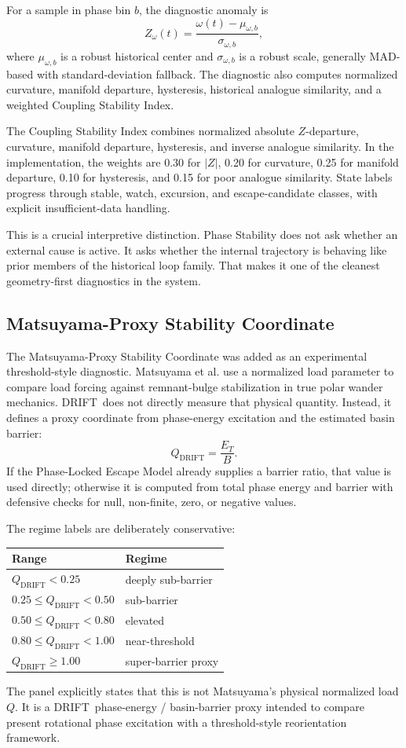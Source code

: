 \documentclass[11pt]{article}
\newcommand{\DRIFT}{\textsc{DRIFT}}
\newcommand{\Qdrift}{Q_{\mathrm{DRIFT}}}
\newcommand{\Zomega}{Z_{\omega}}
\begin{document}
For a sample in phase bin \(b\), the diagnostic anomaly is
\[
\Zomega(t)=\frac{\omega(t)-\mu_{\omega,b}}{\sigma_{\omega,b}},
\]
where \(\mu_{\omega,b}\) is a robust historical center and \(\sigma_{\omega,b}\) is a robust scale, generally MAD-based with standard-deviation fallback. The diagnostic also computes normalized curvature, manifold departure, hysteresis, historical analogue similarity, and a weighted Coupling Stability Index.

The Coupling Stability Index combines normalized absolute \(Z\)-departure, curvature, manifold departure, hysteresis, and inverse analogue similarity. In the implementation, the weights are 0.30 for \(|Z|\), 0.20 for curvature, 0.25 for manifold departure, 0.10 for hysteresis, and 0.15 for poor analogue similarity. State labels progress through stable, watch, excursion, and escape-candidate classes, with explicit insufficient-data handling.

This is a crucial interpretive distinction. Phase Stability does not ask whether an external cause is active. It asks whether the internal trajectory is behaving like prior members of the historical loop family. That makes it one of the cleanest geometry-first diagnostics in the system.

\subsection{Matsuyama-Proxy Stability Coordinate}
The Matsuyama-Proxy Stability Coordinate was added as an experimental threshold-style diagnostic. Matsuyama et al. use a normalized load parameter to compare load forcing against remnant-bulge stabilization in true polar wander mechanics. \DRIFT\ does not directly measure that physical quantity. Instead, it defines a proxy coordinate from phase-energy excitation and the estimated basin barrier:
\[
\Qdrift=\frac{E_T}{B}.
\]
If the Phase-Locked Escape Model already supplies a barrier ratio, that value is used directly; otherwise it is computed from total phase energy and barrier with defensive checks for null, non-finite, zero, or negative values.

The regime labels are deliberately conservative:
\begin{center}
\begin{tabular}{ll}
\toprule
\textbf{Range} & \textbf{Regime}\\
\midrule
\(\Qdrift<0.25\) & deeply sub-barrier\\
\(0.25\leq\Qdrift<0.50\) & sub-barrier\\
\(0.50\leq\Qdrift<0.80\) & elevated\\
\(0.80\leq\Qdrift<1.00\) & near-threshold\\
\(\Qdrift\geq1.00\) & super-barrier proxy\\
\bottomrule
\end{tabular}
\end{center}
The panel explicitly states that this is not Matsuyama's physical normalized load \(Q\). It is a \DRIFT\ phase-energy / basin-barrier proxy intended to compare present rotational phase excitation with a threshold-style reorientation framework.
\end{document}

